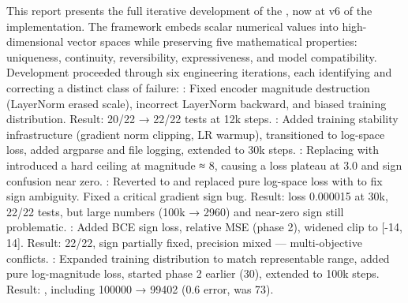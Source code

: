 \markdownRendererOlEndTight \markdownRendererInterblockSeparator
{}\markdownRendererThematicBreak{}\markdownRendererInterblockSeparator
{}
\markdownRendererSectionEnd \markdownRendererSectionBegin
{}\markdownRendererInterblockSeparator
{}This report presents the full iterative development of the , now at v6 of the implementation. The framework embeds scalar numerical values into high-dimensional vector spaces while preserving five mathematical properties: uniqueness, continuity, reversibility, expressiveness, and model compatibility.\markdownRendererParagraphSeparator
{}Development proceeded through six engineering iterations, each identifying and correcting a distinct class of failure:\markdownRendererInterblockSeparator
{}\markdownRendererUlBeginTight
\markdownRendererUlItem {}: Fixed encoder magnitude destruction (LayerNorm erased scale), incorrect LayerNorm backward, and biased training distribution. Result: 20/22 → 22/22 tests at 12k steps.\markdownRendererUlItemEnd 
\markdownRendererUlItem {}: Added training stability infrastructure (gradient norm clipping, LR warmup), transitioned to log-space loss, added argparse and file logging, extended to 30k steps.\markdownRendererUlItemEnd 
\markdownRendererUlItem {}: Replacing  with  introduced a hard ceiling at magnitude ≈ 8, causing a loss plateau at \markdownRendererTilde{}3.0 and sign confusion near zero.\markdownRendererUlItemEnd 
\markdownRendererUlItem {}: Reverted to  and replaced pure log-space loss with  to fix sign ambiguity. Fixed a critical gradient sign bug. Result: loss 0.000015 at 30k, 22/22 tests, but large numbers (100k → 2960) and near-zero sign still problematic.\markdownRendererUlItemEnd 
\markdownRendererUlItem {}: Added BCE sign loss, relative MSE (phase 2), widened clip to [-14, 14]. Result: 22/22, sign partially fixed, precision mixed — multi-objective conflicts.\markdownRendererUlItemEnd 
\markdownRendererUlItem {}: Expanded training distribution to match representable range, added pure log-magnitude loss, started phase 2 earlier (30\markdownRendererPercentSign{}), extended to 100k steps. Result: , including 100000 → 99402 (0.6\markdownRendererPercentSign{} error, was 73\markdownRendererPercentSign{}).\markdownRendererUlItemEnd 
